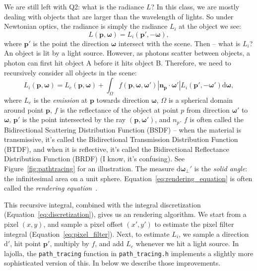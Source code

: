 We are still left with Q2: what is the radiance $L$? In this class, we are mostly dealing with objects that are larger than the wavelength of lights. So under Newtonian optics, the radiance is simply the radiance $L_i$ at the object we see:
\begin{equation}
    L(\mathbf{p}, \mathbf{\omega}) = L_i(\mathbf{p}', -\mathbf{\omega}),
\end{equation}
where $\mathbf{p}'$ is the point the direction $\mathbf{\omega}$ intersect with the scene. Then -- what is $L_i$? An object is lit by a light source. However, as photons scatter between objects, a photon can first hit object A before it hits object B. Therefore, we need to recursively consider all objects in the scene:
\begin{equation}
    L_i(\mathbf{p}, \mathbf{\omega}) = L_e(\mathbf{p}, \mathbf{\omega}) + \int_{\Omega} f(\mathbf{p}, \mathbf{\omega}, \mathbf{\omega}') |\mathbf{n}_{\mathbf{p}} \cdot \mathbf{\omega}'| L_i(\mathbf{p}', -\mathbf{\omega}') \mathrm{d} \mathbf{\omega},
    \label{eq:rendering_equation}
\end{equation}
where $L_e$ is the \emph{emission} at $\mathbf{p}$ towards direction $\mathbf{\omega}$, $\Omega$ is a spherical domain around point $\mathbf{p}$, $f$ is the reflectance of the object at point $p$ from direction $\mathbf{\omega}'$ to $\mathbf{\omega}$, $\mathbf{p}'$ is the point intersected by the ray $(\mathbf{p}, \mathbf{\omega}')$, and $n_{p}$. $f$ is often called the Bidirectional Scattering Distribution Function (BSDF) -- when the material is transmissive, it's called the Bidirectional Transmission Distribution Function (BTDF), and when it is reflective, it's called the Bidirectional Reflectance Distribution Function (BRDF) (I know, it's confusing). See Figure~\ref{fig:pathtracing} for an illustration. The measure $\mathrm{d} \mathbf{\omega}_{\bot}'$ is the \emph{solid angle}: the infinitesimal area on a unit sphere. Equation~\ref{eq:rendering_equation} is often called the \emph{rendering equation}~\cite{Kajiya:1986:RE}.

This recursive integral, combined with the integral discretization (Equation~\ref{eq:discretization}), gives us an rendering algorithm. We start from a pixel $(x, y)$, and sample a pixel offset $(x', y')$ to estimate the pixel filter integral (Equation~\ref{eq:pixel_filter}). Next, to estimate $L_i$, we sample a direction $\mathrm{d}'$, hit point $\mathbf{p}'$, multiply by $f$, and add $L_e$ whenever we hit a light source. In lajolla, the \lstinline{path_tracing} function in \lstinline{path_tracing.h} implements a slightly more sophisticated version of this. In below we describe those improvements.


